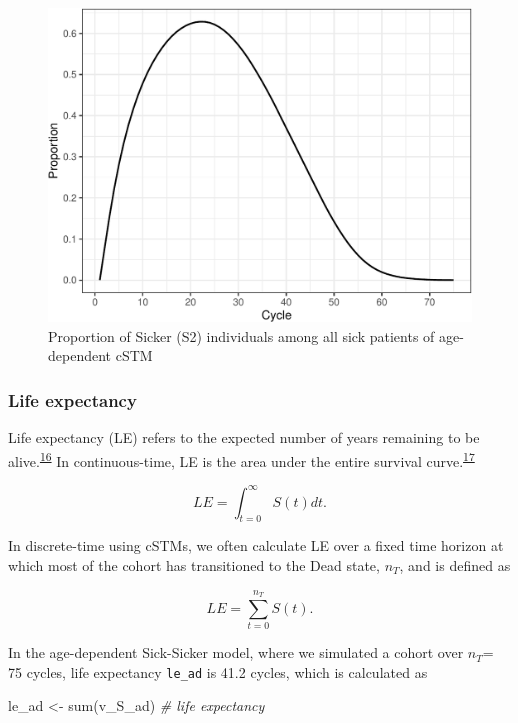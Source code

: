 \documentclass[
]{article}
\newenvironment{Shaded}{\begin{snugshade}}{\end{snugshade}}
\newcommand{\CommentTok}[1]{\textcolor[rgb]{0.56,0.35,0.01}{\textit{#1}}}
\newcommand{\FunctionTok}[1]{\textcolor[rgb]{0.00,0.00,0.00}{#1}}
\newcommand{\NormalTok}[1]{#1}
\newcommand{\OtherTok}[1]{\textcolor[rgb]{0.56,0.35,0.01}{#1}}
\begin{document}
\begin{figure}[H]

{\centering \includegraphics{../figs/Sick-Sicker-PropS2-AgeDep-1} 

}

\caption{Proportion of Sicker (S2) individuals among all sick patients of age-dependent cSTM}\label{fig:Sick-Sicker-PropS2-AgeDep}
\end{figure}

\hypertarget{life-expectancy}{%
\subsubsection{Life expectancy}\label{life-expectancy}}

Life expectancy (LE) refers to the expected number of years remaining to be alive.\textsuperscript{\protect\hyperlink{ref-Lee2003a}{16}} In continuous-time, LE is the area under the entire survival curve.\textsuperscript{\protect\hyperlink{ref-Klein2003}{17}}

\[
LE = \int_{t=0}^{\infty}{S(t) dt}.
\]

In discrete-time using cSTMs, we often calculate LE over a fixed time horizon at which most of the cohort has transitioned to the Dead state, \(n_T\), and is defined as

\[
  LE = \sum_{t=0}^{n_T}{S(t)}.
\]

In the age-dependent Sick-Sicker model, where we simulated a cohort over \(n_T\)= 75 cycles, life expectancy \texttt{le\_ad} is 41.2 cycles, which is calculated as

\begin{Shaded}
\begin{Highlighting}[]
\NormalTok{le\_ad }\OtherTok{\textless{}{-}} \FunctionTok{sum}\NormalTok{(v\_S\_ad) }\CommentTok{\# life expectancy}
\end{Highlighting}
\end{Shaded}
\end{document}
